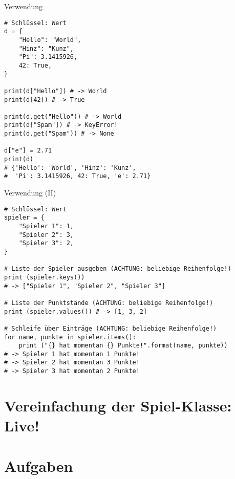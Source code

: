 \begin{frame}[fragile]{Verwendung}
    \begin{lstlisting}
# Schlüssel: Wert
d = {
    "Hello": "World",
    "Hinz": "Kunz",
    "Pi": 3.1415926,
    42: True,
}

print(d["Hello"]) # -> World
print(d[42]) # -> True

print(d.get("Hello")) # -> World
print(d["Spam"]) # -> KeyError!
print(d.get("Spam")) # -> None

d["e"] = 2.71
print(d) 
# {'Hello': 'World', 'Hinz': 'Kunz',
#  'Pi': 3.1415926, 42: True, 'e': 2.71}
    \end{lstlisting}
\end{frame}

\begin{frame}[fragile]{Verwendung (II)}

    \begin{lstlisting}
# Schlüssel: Wert
spieler = {
    "Spieler 1": 1,
    "Spieler 2": 3,
    "Spieler 3": 2,
}

# Liste der Spieler ausgeben (ACHTUNG: beliebige Reihenfolge!)
print (spieler.keys()) 
# -> ["Spieler 1", "Spieler 2", "Spieler 3"]

# Liste der Punktstände (ACHTUNG: beliebige Reihenfolge!)
print (spieler.values()) # -> [1, 3, 2]

# Schleife über Einträge (ACHTUNG: beliebige Reihenfolge!)
for name, punkte in spieler.items():
    print ("{} hat momentan {} Punkte!".format(name, punkte))
# -> Spieler 1 hat momentan 1 Punkte!
# -> Spieler 2 hat momentan 3 Punkte!
# -> Spieler 3 hat momentan 2 Punkte!
    \end{lstlisting}
\end{frame}

\section{Vereinfachung der Spiel-Klasse: Live!}

\section{Aufgaben}

